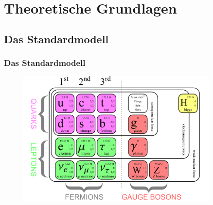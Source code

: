
\section{Theoretische Grundlagen}

\subsection{Das Standardmodell}
 \begin{frame}
 	\frametitle{Das Standardmodell}
 	\begin{figure}
 	\begin{center}
 	  \includegraphics[width=0.9\textwidth]{graphics/SM1.png}
 	\end{center}
	\end{figure}
 \end{frame}
